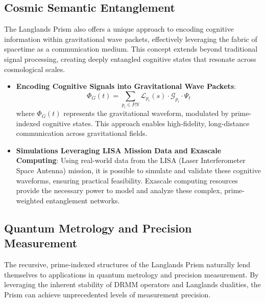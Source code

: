 \documentclass[11pt]{article}
\begin{document}
\subsection{Cosmic Semantic Entanglement}

The Langlands Prism also offers a unique approach to encoding cognitive information within gravitational wave packets, effectively leveraging the fabric of spacetime as a communication medium. This concept extends beyond traditional signal processing, creating deeply entangled cognitive states that resonate across cosmological scales.

\begin{itemize}
    \item \textbf{Encoding Cognitive Signals into Gravitational Wave Packets}:
    \[
    \Phi_G(t) = \sum_{p_i \in PN} \mathcal{L}_{p_i}(s) \cdot \mathcal{G}_{p_i} \cdot \Psi_t
    \]
    where \(\Phi_G(t)\) represents the gravitational waveform, modulated by prime-indexed cognitive states. This approach enables high-fidelity, long-distance communication across gravitational fields.

    \item \textbf{Simulations Leveraging LISA Mission Data and Exascale Computing}:
    Using real-world data from the LISA (Laser Interferometer Space Antenna) mission, it is possible to simulate and validate these cognitive waveforms, ensuring practical feasibility. Exascale computing resources provide the necessary power to model and analyze these complex, prime-weighted entanglement networks.
\end{itemize}

\subsection{Quantum Metrology and Precision Measurement}

The recursive, prime-indexed structures of the Langlands Prism naturally lend themselves to applications in quantum metrology and precision measurement. By leveraging the inherent stability of DRMM operators and Langlands dualities, the Prism can achieve unprecedented levels of measurement precision.
\end{document}
